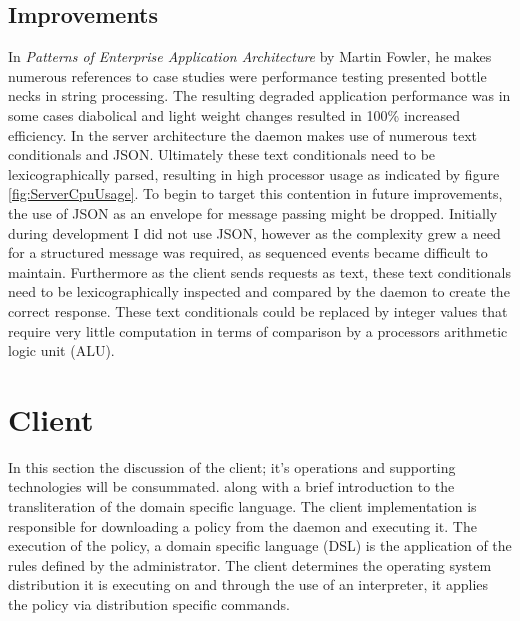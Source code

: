 	
	\subsection{Improvements}

		\normalsize
		{					
			In \textit{Patterns of Enterprise Application Architecture} by Martin Fowler, he makes numerous references to case studies were 
			performance testing presented bottle necks in string processing.  The resulting degraded application performance was in some cases
			diabolical and light weight changes resulted in 100\% increased efficiency.  
			In the server architecture the daemon makes use of numerous text conditionals and JSON.  Ultimately these text conditionals need to be
			lexicographically parsed, resulting in high processor usage as indicated by figure \ref{fig:ServerCpuUsage}.
			\newline			
			\newline
			To begin to target this contention in future improvements, the use of JSON as an envelope for message passing might be dropped.
			Initially during development I did not use JSON, however as the complexity grew a need for a structured message was required, as sequenced
			events became difficult to maintain.
			\newline
			\newline
			Furthermore as the client sends requests as text, these text conditionals need to be lexicographically inspected and compared
			by the daemon to create the correct response.  These text conditionals could be replaced by integer values
			that require very little computation in terms of comparison by a processors arithmetic logic unit (ALU).  
			\newline
		}	

	
	
	
	
	
	
	
	
	
	
	
	
	
	
	


\section{Client} 

	\normalsize
	{
		In this section the discussion of the client; it's operations and supporting technologies will be consummated.
		along with a brief introduction to the transliteration of the domain specific language.
		\newline
		\newline
		The client implementation is responsible for downloading a policy from the daemon and executing it.
		The execution of the policy, a domain specific language (DSL) is the application of the rules defined by the administrator.
		The client determines the operating system distribution it is executing on and through the use of an interpreter, it applies the policy  
		via distribution specific commands.  
	}

